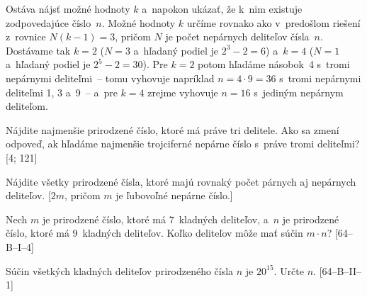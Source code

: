 {Ostáva nájsť možné hodnoty $k$ a~napokon
ukázať, že k~nim existuje zodpovedajúce číslo~$n$. Možné hodnoty $k$ určíme
rovnako ako v~predošlom riešení z~rovnice $N(k-1) = 3$, pričom $N$ je počet
nepárnych deliteľov čísla~$n$. Dostávame tak $k= 2$ ($N = 3$ a~hľadaný podiel
je $2^3-2 = 6$) a~$k= 4$ ($N = 1$ a~hľadaný podiel je $2^5-2 = 30$). Pre
$k= 2$ potom hľadáme násobok~4 s~tromi nepárnymi deliteľmi~-- tomu
vyhovuje napríklad $n = 4 \cdot 9 = 36$ s~tromi nepárnymi deliteľmi
1, 3 a~9~-- a~pre $k= 4$ zrejme vyhovuje $n = 16$
s~jediným nepárnym deliteľom.


Nájdite najmenšie prirodzené číslo, ktoré má práve tri delitele. Ako sa
zmení odpoveď, ak hľadáme najmenšie trojciferné nepárne číslo s~práve
tromi deliteľmi? [4; 121]

Nájdite všetky prirodzené čísla, ktoré majú rovnaký počet párnych
aj nepárnych deliteľov. [$2m$, pričom $m$ je ľubovoľné nepárne číslo.]

\D
Nech $m$ je prirodzené číslo, ktoré má 7~kladných deliteľov, a~$n$ je
prirodzené číslo, ktoré má 9~kladných deliteľov. Koľko deliteľov môže mať
súčin $m\cdot n$? [64--B--I--4]

Súčin všetkých kladných deliteľov prirodzeného čísla $n$ je $20^{15}$. Určte $n$. [64--B--II--1]
}

